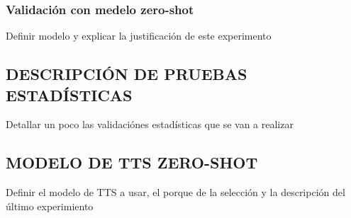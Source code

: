 \subsubsection{Validación con medelo zero-shot}
Definir modelo y explicar la justificación de este experimento

\subsection{DESCRIPCIÓN DE PRUEBAS ESTADÍSTICAS}
Detallar un poco las validaciónes estadísticas que se van a realizar

\subsection{MODELO DE TTS ZERO-SHOT}
Definir el modelo de TTS a usar, el porque de la selección y la descripción del último experimiento